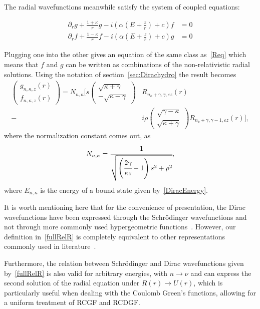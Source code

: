 The radial wavefunctions meanwhile satisfy the system of coupled equations:
\begin{subeqeations}
    \begin{align}
	\partial_r g+\frac{1+\kappa}{r} g - i \left(\alpha \left(E+\frac{z}{r}\right)+c\right)f &=0 \\
\partial_r f+\frac{1-\kappa}{r} f - i \left(\alpha \left(E+\frac{z}{r}\right)+c\right)g &=0 
\end{align}
\end{subeqeations}
Plugging one into the other gives an equation of the same class as~\eqref{Req} which means that $f$ and $g$ can be written as combinations of the non-relativistic radial solutions. Using the notation of section~\eqref{sec:Dirachydro} the result becomes
\begin{align} \label{fullRelR}
\left(\begin{matrix}g_{n,\kappa,z}(r)  \\ f_{n,\kappa,z}(r)\end{matrix}\right) = N_{n,\kappa}\Big[s \left(\begin{matrix}\sqrt{\kappa+\gamma}  \\-\sqrt{\kappa-\gamma}\end{matrix}\right) &R_{n_k+\gamma,\gamma,\varepsilon z}(r) \nonumber \\
-&i \rho \left(\begin{matrix}\sqrt{\gamma-\kappa}  \\\sqrt{\kappa+\gamma}\end{matrix}\right) R_{n_k + \gamma,\gamma-1,\varepsilon z}(r)\Big],
\end{align}
where the normalization constant comes out, as
\begin{align*}
  N_{n,\kappa}=\cfrac{1}{\sqrt{\left(\cfrac{2 \gamma}{\kappa \varepsilon} -1 \right)s^2+\rho^2}},
\end{align*}
where $E_{n,\kappa}$ is the energy of a bound state given by~\eqref{DiracEnergy}.

It is worth mentioning here that for the convenience of presentation, the Dirac
  wavefunctions have been expressed through the Schr\"odinger wavefunctions and not through more
  commonly used hypergeometric functions~\cite{AS}. However, our definition in~\eqref{fullRelR} is completely equivalent to other representations commonly used in literature~\cite{flugge_practical_1971}.

Furthermore, the relation between Schr\"odinger and Dirac wavefunctions given by~\eqref{fullRelR} is also valid for arbitrary energies, with $n \rightarrow \nu$ and can express the second solution of the radial equation under $R(r) \rightarrow U(r)$, which is particularly useful when dealing with the Coulomb Green's functions, allowing for a uniform treatment of RCGF and RCDGF.

